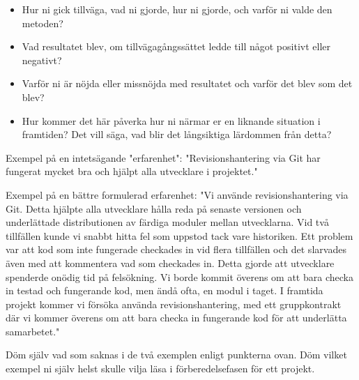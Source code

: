 \begin{itemize}
  \item Hur ni gick tillväga, vad ni gjorde, hur ni gjorde, och varför
    ni valde den metoden?
  \item Vad resultatet blev, om tillvägagångssättet ledde till något
    positivt eller negativt?
  \item Varför ni är nöjda eller missnöjda med resultatet och varför
    det blev som det blev?
  \item Hur kommer det här påverka hur ni närmar er en liknande
    situation i framtiden? Det vill säga, vad blir det långsiktiga
    lärdommen från detta?
\end{itemize}
Exempel på en intetsägande "erfarenhet": "Revisionshantering via Git
har fungerat mycket bra och hjälpt alla utvecklare i projektet."

Exempel på en bättre formulerad erfarenhet: "Vi använde
revisionshantering via Git. Detta hjälpte alla utvecklare hålla reda
på senaste versionen och underlättade distributionen av färdiga
moduler mellan utvecklarna. Vid två tillfällen kunde vi snabbt hitta
fel som uppstod tack vare historiken. Ett problem var att kod som inte
fungerade checkades in vid flera tillfällen och det slarvades även med
att kommentera vad som checkades in. Detta gjorde att utvecklare
spenderde onödig tid på felsökning. Vi borde kommit överens om att
bara checka in testad och fungerande kod, men ändå ofta, en modul i
taget. I framtida projekt kommer vi försöka använda
revisionshantering, med ett gruppkontrakt där vi kommer överens om att
bara checka in fungerande kod för att underlätta samarbetet."

Döm själv vad som saknas i de två exemplen enligt punkterna ovan. Döm
vilket exempel ni själv helst skulle vilja läsa i förberedelsefasen
för ett projekt.

  

